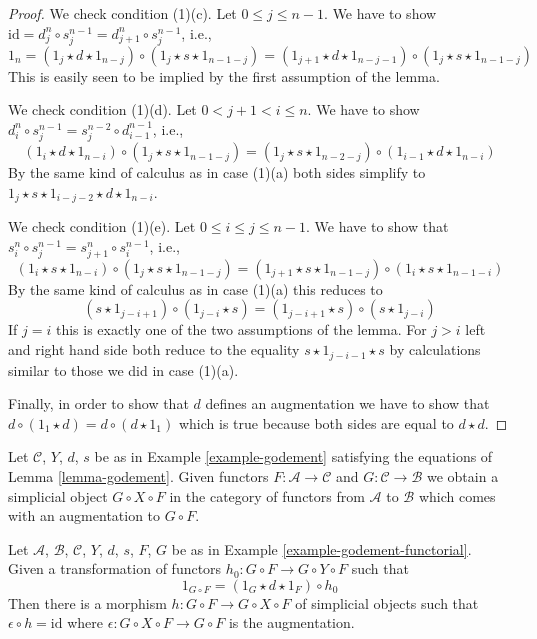 \begin{proof}
\medskip\noindent
We check condition (1)(c). Let $0 \leq j \leq n - 1$. We have to show
$\text{id} = d^n_j \circ s^{n - 1}_j = d^n_{j + 1} \circ s^{n - 1}_j$, i.e.,
$$
1_n =
(1_j \star d \star 1_{n - j}) \circ
(1_j \star s \star 1_{n - 1 - j}) =
(1_{j + 1} \star d \star 1_{n - j - 1}) \circ
(1_j \star s \star 1_{n - 1 - j})
$$
This is easily seen to be implied by the first assumption of the lemma.

\medskip\noindent
We check condition (1)(d). Let $0 < j + 1 < i \leq n$. We have to show
$d^n_i \circ s^{n - 1}_j = s^{n - 2}_j \circ d^{n - 1}_{i - 1}$, i.e.,
$$
(1_i \star d \star 1_{n - i}) \circ
(1_j \star s \star 1_{n - 1 - j}) =
(1_j \star s \star 1_{n - 2 - j}) \circ
(1_{i - 1} \star d \star 1_{n - i})
$$
By the same kind of calculus as in case (1)(a) both sides simplify
to $1_j \star s \star 1_{i - j - 2} \star d \star 1_{n - i}$.

\medskip\noindent
We check condition (1)(e). Let $0 \leq i \leq j \leq n - 1$. We
have to show that
$s^n_i \circ s^{n - 1}_j = s^n_{j + 1} \circ s^{n - 1}_i$, i.e.,
$$
(1_i \star s \star 1_{n - i}) \circ
(1_j \star s \star 1_{n - 1 - j}) =
(1_{j + 1} \star s \star 1_{n - 1 - j}) \circ
(1_i \star s \star 1_{n - 1 - i})
$$
By the same kind of calculus as in case (1)(a) this reduces to
$$
(s \star 1_{j - i + 1}) \circ (1_{j - i} \star s) =
(1_{j - i + 1} \star s) \circ (s \star 1_{j - i})
$$
If $j = i$ this is exactly one of the two assumptions of the lemma.
For $j > i$ left and
right hand side both reduce to the equality $s \star 1_{j - i - 1} \star s$
by calculations similar to those we did in case (1)(a).

\medskip\noindent
Finally, in order to show that $d$ defines an augmentation we have
to show that $d \circ (1_1 \star d) = d \circ (d \star 1_1)$ which is
true because both sides are equal to $d \star d$.
\end{proof}

\begin{example}
\label{example-godement-functorial}
Let $\mathcal{C}$, $Y$, $d$, $s$ be as in Example \ref{example-godement}
satisfying the equations of Lemma \ref{lemma-godement}.
Given functors $F : \mathcal{A} \to \mathcal{C}$ and
$G : \mathcal{C} \to \mathcal{B}$ we obtain a simplicial
object $G \circ X \circ F$ in the category of functors
from $\mathcal{A}$ to $\mathcal{B}$ which comes with an
augmentation to $G \circ F$.
\end{example}

\begin{lemma}
\label{lemma-godement-section}
Let $\mathcal{A}$, $\mathcal{B}$, $\mathcal{C}$, $Y$, $d$, $s$, $F$, $G$
be as in Example \ref{example-godement-functorial}. Given a transformation
of functors $h_0 : G \circ F \to G \circ Y \circ F$ such that
$$
1_{G \circ F} = (1_G \star d \star 1_F) \circ h_0
$$
Then there is a morphism $h : G \circ F \to G \circ X \circ F$
of simplicial objects such that $\epsilon \circ h = \text{id}$ where
$\epsilon : G \circ X \circ F \to G \circ F$ is the augmentation.
\end{lemma}

